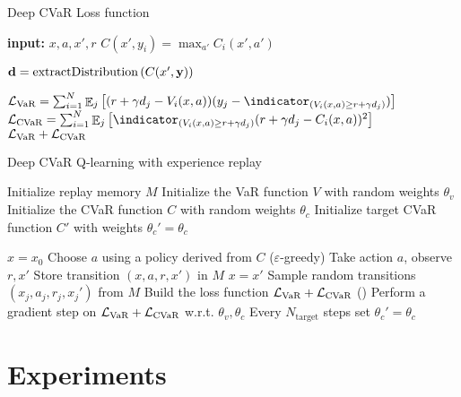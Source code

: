 \begin{algorithm}
\caption{Deep CVaR Loss function}
\begin{algorithmic}\label{alg:cvardqnloss}

    \STATE \textbf{input:} $x, a, x', r$
    \bindent
	\STATE $C(x', y_i) = \max_{a'} C_i(x', a')$
	\ENDFOR
	
	\STATE $\mathbf{d}= \text{extractDistribution}\left( {C(x', \mathbf{y})} \right)$

	
	\STATE $\mathcal{L}_{\var}=\sum_{i=1}^{N} \expect_j\bsquare{(r + \gamma d_j - V_i(x, a))(y_j - \indicator_{(V_i(x, a) \ge r + \gamma d_j)})}$
	\STATE $\mathcal{L}_{\cvar}=\sum_{i=1}^{N} \expect_j\bsquare{\indicator_{(V_i(x, a) \ge r + \gamma d_j)}(r + \gamma d_j - C_i(x, a))^2}$
	\eindent
	\RETURN $\mathcal{L}_{\text{VaR}} + \mathcal{L}_{\text{CVaR}}$
	
\end{algorithmic}
\end{algorithm}

\begin{algorithm}
\caption{Deep CVaR Q-learning with experience replay}
\begin{algorithmic}\label{alg:cvardqn}

    \STATE Initialize replay memory $M$
    \STATE Initialize the VaR function $V$ with random weights $\theta_v$
    \STATE Initialize the CVaR function $C$ with random weights $\theta_c$
    \STATE Initialize target CVaR function $C'$ with weights $\theta_c'=\theta_c$

    \STATE $x=x_0$
	\STATE Choose $a$ using a policy derived from $C$ ($\varepsilon$-greedy)
	\STATE Take action $a$, observe $r, x'$
	\STATE Store transition $(x, a, r, x')$ in $M$
	\STATE $x = x'$
	\STATE Sample random transitions $(x_j, a_j, r_j, x_j')$ from $M$
	\STATE Build the loss function $\mathcal{L}_{\text{VaR}} + \mathcal{L}_{\text{CVaR}}$ ()
    \STATE Perform a gradient step on $\mathcal{L}_{\text{VaR}} + \mathcal{L}_{\text{CVaR}}$ w.r.t. $\theta_v, \theta_c$
    \STATE Every $N_\text{target}$ steps set $\theta_c'=\theta_c$
	\ENDWHILE
	\ENDFOR
	
\end{algorithmic}
\end{algorithm}



\section{Experiments}

